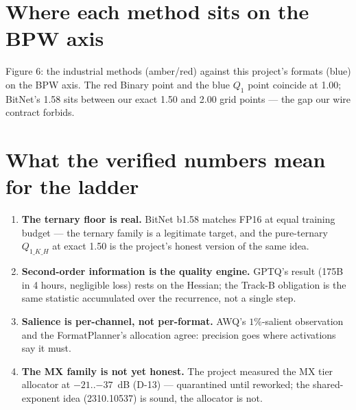 \section{Where each method sits on the BPW axis}

\begin{center}

\small Figure 6: the industrial methods (amber/red) against this project's formats (blue) on
the BPW axis. The red Binary point and the blue $Q_1$ point coincide at 1.00; BitNet's 1.58
sits between our exact 1.50 and 2.00 grid points --- the gap our wire contract forbids.
\end{center}

\section{What the verified numbers mean for the ladder}

\begin{enumerate}
\item \textbf{The ternary floor is real.} BitNet b1.58 matches FP16 at equal training budget
--- the ternary family is a legitimate target, and the pure-ternary $Q_{1\_K\_H}$ at exact
1.50 is the project's honest version of the same idea.
\item \textbf{Second-order information is the quality engine.} GPTQ's result (175B in 4
hours, negligible loss) rests on the Hessian; the Track-B obligation is the same statistic
accumulated over the recurrence, not a single step.
\item \textbf{Salience is per-channel, not per-format.} AWQ's $1\%$-salient observation and
the FormatPlanner's allocation agree: precision goes where activations say it must.
\item \textbf{The MX family is not yet honest.} The project measured the MX tier allocator at
$-21$..$-37$~dB (D-13) --- quarantined until reworked; the shared-exponent idea (2310.10537)
is sound, the allocator is not.
\end{enumerate}

